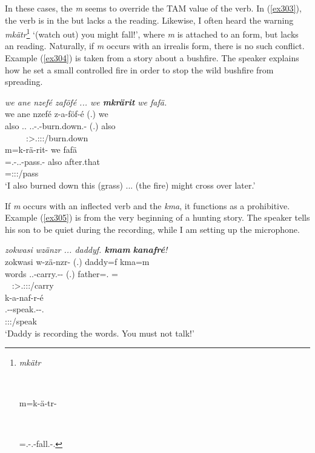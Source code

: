 In these cases, the  \emph{m} seems to override the TAM value of the verb. In (\ref{ex303}), the verb is in the  but lacks a the reading. Likewise, I often heard the warning \emph{mkätr}\footnote{\parbox{0.02cm}{\hfill}\parbox{6cm}{\emph{mkätr}}\\ \parbox{0.05cm}{\hfill}\parbox{6cm}{m=k-ä-tr-\Zero}\\ \parbox{0.05cm}{\hfill}\parbox{6cm}{\Appr=\M.\Bet-\Vc.\Ndu-fall.\Rs-\Ssg.{\Imp}}} `(watch out) you might fall!', where \emph{m} is attached to an  form, but lacks an  reading. Naturally, if \emph{m} occurs with an irrealis form, there is no such conflict. Example (\ref{ex304}) is taken from a story about a bushfire. The speaker explains how he set a small controlled fire in order to stop the wild bushfire from spreading.

\begin{exe}
	\ex \emph{we ane nzefé zaföfé ... we \textbf{mkrärit} we fafä.}\\
	\glll we ane nzefé z-a-föf-é (.) we\\
	also {\Dem} \Fsg.\Erg.{\Emph} \Tsg.\F.\Gam-\Vc.\Ndu-burn.down.\Rs-\Fsg{} (.) also\\
	~ ~ ~ {\footnotesize \Fsg:\Sbj>\Tsg.\F:\Obj:\Rpst:\Pfv/burn.down} ~ ~\\
	\sn
	\glll m=k-rä-rit-\Zero{} we fafä\\
	\Appr=\M.\Bet-\Irr.\Vc.\Ndu-pass.\Rs-\Stsg{} also after.that\\
	{\footnotesize \Appr=\Stsg:\Sbj:\Irr:\Pfv/pass} ~ ~\\
	\trans `I also burned down this (grass) ... (the fire) might cross over later.'\\ 
	\label{ex304}
\end{exe}

If \emph{m} occurs with an  inflected verb and the  \emph{kma}, it functions as a prohibitive. Example (\ref{ex305}) is from the very beginning of a hunting story. The speaker tells his son to be quiet during the recording, while I am setting up the microphone.

\begin{exe}
	\ex \emph{zokwasi wzänzr ... daddyf. \textbf{kmam} \textbf{kanafré}!}\\
	\glll zokwasi w-zä-nzr-\Zero{} (.) daddy=f kma=m\\
	words \Tsg.\F.\Alph-carry.\Ext-\Ndu-\Stsg{} (.) father=\Erg.{\Sg} \Pot={\Appr}\\
	~ {\footnotesize \Stsg:\Sbj>\Tsg.\F:\Obj:\Nonpast:\Ipfv/carry} ~ ~ ~\\
	\sn
	\glll k-a-naf-r-é\\
	\M.\Bet-\Vc-speak.\Ext-\Ndu-\Ssg.\Imp\\
	{\footnotesize \Ssg:\Sbj:\Imp:\Ipfv/speak}\\
	\trans `Daddy is recording the words. You must not talk!' 
	\label{ex305}
\end{exe}

